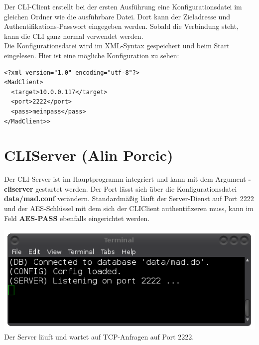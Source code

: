\documentclass[12pt,a4paper]{report}
\begin{document}
\begin{onehalfspace}
Der CLI-Client erstellt bei der ersten Ausführung eine Konfigurationsdatei im gleichen Ordner wie die ausführbare Datei. Dort kann der Zieladresse und Authentifikations-Passwort eingegeben werden. Sobald die Verbindung steht, kann die CLI ganz normal verwendet werden.\\
Die Konfigurationsdatei wird im XML-Syntax gespeichert und beim Start eingelesen. Hier ist eine mögliche Konfiguration zu sehen:\\
\begin{lstlisting}
<?xml version="1.0" encoding="utf-8"?>
<MadClient>
  <target>10.0.0.117</target>
  <port>2222</port>
  <pass>meinpass</pass>
</MadClient>>
\end{lstlisting}

\chapter{CLIServer (Alin Porcic)}

Der CLI-Server ist im Hauptprogramm integriert und kann mit dem Argument \textbf{-cliserver} gestartet werden. Der Port lässt sich über die Konfigurationsdatei \textbf{data/mad.conf} verändern. Standardmäßig läuft der Server-Dienst auf Port 2222 und der AES-Schlüssel mit dem sich der CLIClient authentifizeren muss, kann im Feld \textbf{AES-PASS} ebenfalls eingerichtet werden.

\begin{center}
\includegraphics[scale=0.6]{img/cli_server.png}\\
Der Server läuft und wartet auf TCP-Anfragen auf Port 2222.
\end{center}


\end{onehalfspace}
\end{document}
